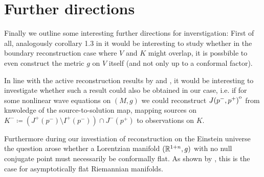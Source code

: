 \chapter*{Further directions}
Finally we outline some interesting further directions for inverstigation: First of all, analogously corollary 1.3 in \cite{kurylev2017inverse} it would be interesting to study whether in the boundary reconstruction case where $V$ and $K$ might overlap, it is possbible to even construct the metric $g$ on $V$ itself (and not only up to a conformal factor).

In line with the active reconstruction results by \cite{wang2019inverse} and \cite{lassas2018inverse}, it would be interesting to investigate whether such a result could also be obtained in our case, i.e. if for some nonlinear wave equations on $(M,g)$ we could reconstruct ${\kern0ptJ(p^-,p^+)}^{\mathrm{o}}$ from knwoledge of the source-to-solution map, mapping sources on $K^-\coloneqq  (J^+(p^-)\setminus I^+(p^-)) \cap J^-(p^+)$ to observations on $K$.

Furthermore during our investiation of reconstruction on the Einstein universe the question arose whether a Lorentzian manifold $(\mathbb{R}^{1+n},g)$ with no null conjugate point must necessarily be conformally flat. As shown by \citet{guillarmou2019asymptotically}, this is the case for asymptotically flat Riemannian manifolds.